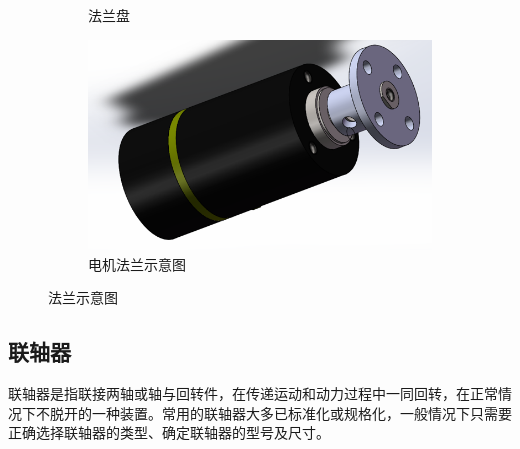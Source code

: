 \documentclass[UTF8]{article} %
\begin{document}
\begin{figure}[H]
\begin{subfigure}[b]{0.2\textwidth}
          \caption{法兰盘}
  \end{subfigure}
  \begin{subfigure}[b]{0.2\textwidth}
    \centering
    \includegraphics[width=\textwidth]{fa3.png}
    \caption{电机法兰示意图}
\end{subfigure}
  \caption{法兰示意图}
\end{figure}

\subsection{联轴器}
联轴器是指联接两轴或轴与回转件，在传递运动和动力过程中一同回转，在正常情况下不脱开的一种装置。常用的联轴器大多已标准化或规格化，一般情况下只需要正确选择联轴器的类型、确定联轴器的型号及尺寸。
\end{document}
